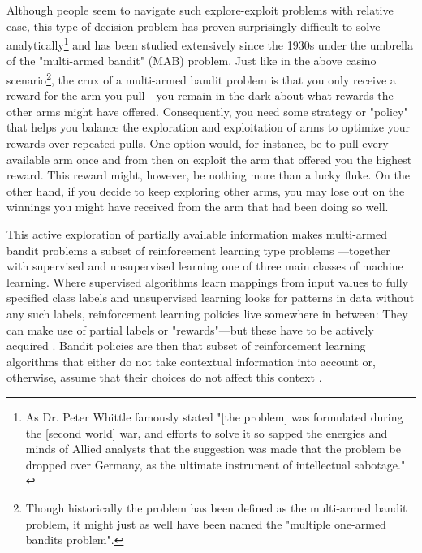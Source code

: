 \documentclass{jss}
\begin{document}
Although people seem to navigate such explore-exploit problems with relative ease, this type of decision problem has proven surprisingly difficult to solve analytically\footnote{As Dr. Peter Whittle famously stated "[the problem] was formulated during the [second world] war, and efforts to solve it so sapped the energies and minds of Allied analysts that the suggestion was made that the problem be dropped over Germany, as the ultimate instrument of intellectual sabotage." \citep{Whittle1979}} and has been studied extensively since the 1930s \citep{Bubeck2012} under the umbrella of the "multi-armed bandit" (MAB) problem. Just like in the above casino scenario\footnote{Though historically the problem has been defined as the multi-armed bandit problem, it might just as well have been named the "multiple one-armed bandits problem".}, the crux of a multi-armed bandit problem is that you only receive a reward for the arm you pull---you remain in the dark about what rewards the other arms might have offered. Consequently, you need some strategy or "policy" that helps you balance the exploration and exploitation of arms to optimize your rewards over repeated pulls. One option would, for instance, be to pull every available arm once and from then on exploit the arm that offered you the highest reward. This reward might, however, be nothing more than a lucky fluke. On the other hand, if you decide to keep exploring other arms, you may lose out on the winnings you might have received from the arm that had been doing so well.

This active exploration of partially available information makes multi-armed bandit problems a subset of reinforcement learning type problems ---together with supervised and unsupervised learning one of three main classes of machine learning. Where supervised algorithms learn mappings from input values to fully specified class labels and unsupervised learning looks for patterns in data without any such labels, reinforcement learning policies live somewhere in between: They can make use of partial labels or "rewards"---but these have to be actively acquired \citep{Jordan2015}. Bandit policies are then that subset of reinforcement learning algorithms that either do not take contextual information into account or, otherwise, assume that their choices do not affect this context \citep{steenwinckel2018self,Sutton1998e}.
\end{document}
